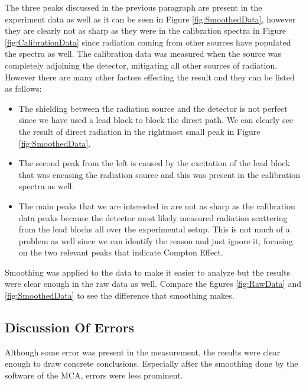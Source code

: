 	The three peaks discussed in the previous paragraph are present in the experiment data as well as it can be seen in Figure \ref{fig:SmoothedData}, however they are clearly not as sharp as they were in the calibration spectra in Figure \ref{fig:CalibrationData} since radiation coming from other sources have populated the spectra as well. The calibration data was measured when the source was completely adjoining the detector, mitigating all other sources of radiation. However there are many other factors effecting the result and they can be listed as follows:
		\begin{itemize}
			\item The shielding between the radiation source and the detector is not perfect since we have used a lead block to block the direct path. We can clearly see the result of direct radiation in the rightmost small peak in Figure \ref{fig:SmoothedData}.
			\item The second peak from the left is caused by the excitation of the lead block that was encasing the radiation source and this was present in the calibration spectra as well.
			\item The main peaks that we are interested in are not as sharp as the calibration data peaks because the detector most likely measured radiation scattering from the lead blocks all over the experimental setup. This is not much of a problem as well since we can identify the reason and just ignore it, focusing on the two relevant peaks that indicate Compton Effect.
		\end{itemize}
	Smoothing was applied to the data to make it easier to analyze but the results were clear enough in the raw data as well. Compare the figures \ref{fig:RawData} and \ref{fig:SmoothedData} to see the difference that smoothing makes.
	
	\subsection{Discussion Of Errors}
		Although some error was present in the measurement, the results were clear enough to draw concrete conclusions. Especially after the smoothing done by the software of the MCA, errors were less prominent.
	

